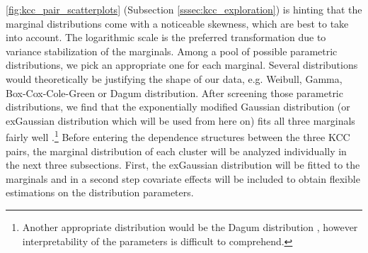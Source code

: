 
\autoref{fig:kcc_pair_scatterplots} (Subsection \ref{sssec:kcc_exploration}) is hinting that the marginal distributions come with a noticeable skewness, which are best to take into account. The logarithmic scale is the preferred transformation due to variance stabilization of the marginals. Among a pool of possible parametric distributions, we pick an appropriate one for each marginal. Several distributions would theoretically be justifying the shape of our data, e.g. Weibull, Gamma, Box-Cox-Cole-Green or Dagum distribution. After screening those parametric distributions, we find that the exponentially modified Gaussian distribution (or exGaussian distribution which will be used from here on) fits all three marginals fairly well \citep{grushka1972characterization}.\footnote{Another appropriate distribution would be the Dagum distribution \citep{dagum1975model}, however interpretability of the parameters is difficult to comprehend.} 
Before entering the dependence structures between the three \ac{KCC} pairs, the marginal distribution of each cluster will be analyzed individually in the next three subsections. First, the exGaussian distribution will be fitted to the marginals and in a second step covariate effects will be included to obtain flexible estimations on the distribution parameters.








